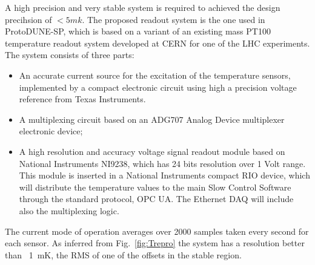 A high precision and very stable system is required to achieved the design precihsion of $< 5 mk$.
The proposed readout system is the one used in ProtoDUNE-SP, which is based on a variant of an existing mass PT100 temperature readout system developed at
CERN for one of the LHC experiments. The system consists of three parts:
\begin{itemize}
\item An accurate current source for the excitation of the temperature sensors, implemented by a compact electronic circuit using high a precision voltage reference from Texas Instruments. 
\item A multiplexing circuit based on an ADG707 Analog Device multiplexer electronic device;
\item A high resolution and accuracy voltage signal readout module based on National Instruments NI9238, which has 24 bits resolution over 1 Volt range.
  This module is inserted in a National Instruments compact RIO device, which will distribute the temperature values to the main Slow Control Software
  through the standard protocol, OPC UA. The Ethernet DAQ will include also the multiplexing logic.
\end{itemize}


The current mode of operation averages over 2000 samples taken every second for each sensor. 
As inferred from Fig.~\ref{fig:Trepro} the system has a resolution better than \
\SI{1}{mK}, the RMS of one of the offsets in the stable region.

